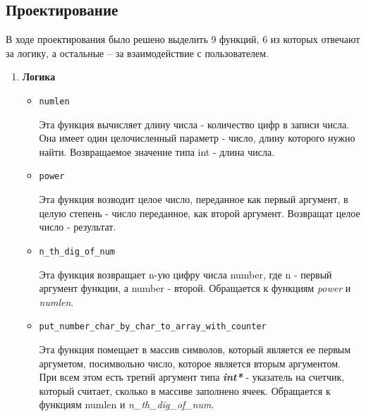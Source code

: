 \documentclass[12pt,a4paper]{report}
\begin{document}
\subsection{Проектирование}
\hspace{\parindent}
В ходе проектирования было решено выделить 9 функций, 6 из которых отвечают за логику, а остальные -- за взаимодействие с пользователем.
\begin{enumerate}
\item \textbf{Логика}
\begin{itemize}
\item \verb-numlen-

Эта функция вычисляет длину числа - количество цифр в записи числа. Она имеет один целочисленный параметр - число, длину которого нужно найти. Возвращаемое значение типа int - длина числа.
\end{itemize}

\begin{itemize}
\item \verb-power-

Эта функция возводит целое число, переданное как первый аргумент, в целую степень - число переданное, как второй аргумент. Возвращат целое число - результат.
\end{itemize}

\begin{itemize}
\item \verb-n_th_dig_of_num-

Эта функция возвращает n-ую цифру числа number, где n - первый аргумент функции, а number - второй. Обращается к функциям \textit{power} и \textit{numlen}.
\end{itemize}

\begin{itemize}
\item \verb-put_number_char_by_char_to_array_with_counter-

Эта функция помещает в массив символов, который является ее первым аргуметом, посимвольно число, которое является вторым аргументом. При всем этом есть третий аргумент типа \textit{\textbf{int*}} - указатель на счетчик, который считает, сколько в массиве заполнено ячеек. Обращается к функциям numlen и \textit{n\_th\_dig\_of\_num}.
\end{itemize}


\end{enumerate}
\end{document}
